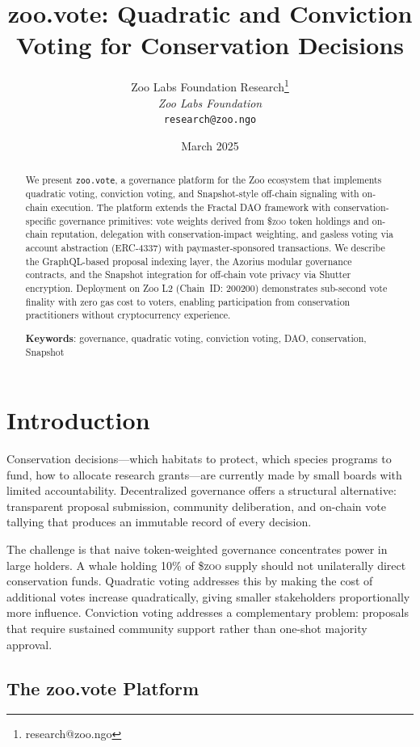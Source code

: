 \documentclass[11pt,letterpaper]{article}
\title{\textbf{zoo.vote: Quadratic and Conviction Voting for Conservation Decisions}}
\author{
Zoo Labs Foundation Research\thanks{research@zoo.ngo}\\
\textit{Zoo Labs Foundation}\\
\texttt{research@zoo.ngo}
}
\date{March 2025}
\newcommand{\ZOO}{\$\textsc{zoo}}
\begin{document}
\zoocoverpage

\begin{abstract}
We present \texttt{zoo.vote}, a governance platform for the Zoo ecosystem that implements quadratic voting, conviction voting, and Snapshot-style off-chain signaling with on-chain execution. The platform extends the Fractal DAO framework with conservation-specific governance primitives: vote weights derived from \ZOO{} token holdings and on-chain reputation, delegation with conservation-impact weighting, and gasless voting via account abstraction (ERC-4337) with paymaster-sponsored transactions. We describe the GraphQL-based proposal indexing layer, the Azorius modular governance contracts, and the Snapshot integration for off-chain vote privacy via Shutter encryption. Deployment on Zoo L2 (Chain~ID: 200200) demonstrates sub-second vote finality with zero gas cost to voters, enabling participation from conservation practitioners without cryptocurrency experience.

\textbf{Keywords}: governance, quadratic voting, conviction voting, DAO, conservation, Snapshot
\end{abstract}

\section{Introduction}

Conservation decisions---which habitats to protect, which species programs to fund, how to allocate research grants---are currently made by small boards with limited accountability. Decentralized governance offers a structural alternative: transparent proposal submission, community deliberation, and on-chain vote tallying that produces an immutable record of every decision.

The challenge is that naive token-weighted governance concentrates power in large holders. A whale holding 10\% of \ZOO{} supply should not unilaterally direct conservation funds. Quadratic voting addresses this by making the cost of additional votes increase quadratically, giving smaller stakeholders proportionally more influence. Conviction voting addresses a complementary problem: proposals that require sustained community support rather than one-shot majority approval.

\subsection{The zoo.vote Platform}
\end{document}
